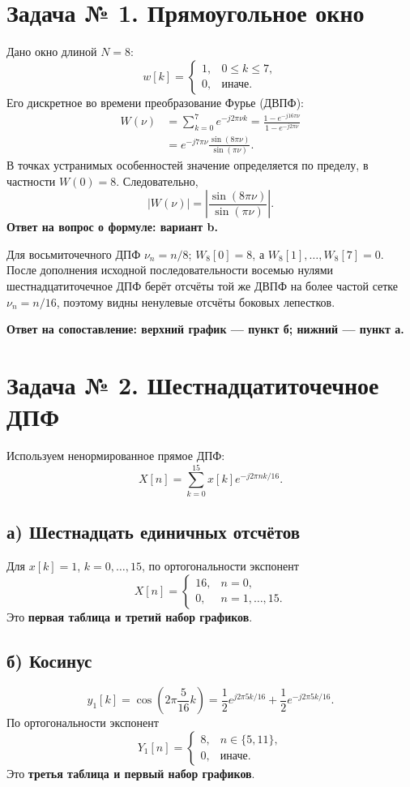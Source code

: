 \documentclass[12pt,a4paper]{article}
\begin{document}
\section*{Задача № 1. Прямоугольное окно}
Дано окно длиной $N=8$:
\[
 w[k]=\begin{cases}1,&0\le k\le7,\\0,&\text{иначе}.\end{cases}
\]
Его дискретное во времени преобразование Фурье (ДВПФ):
\begin{align*}
W(\nu)&=\sum_{k=0}^{7}e^{-j2\pi\nu k}
=\frac{1-e^{-j16\pi\nu}}{1-e^{-j2\pi\nu}}\\
&=e^{-j7\pi\nu}\frac{\sin(8\pi\nu)}{\sin(\pi\nu)}.
\end{align*}
В точках устранимых особенностей значение определяется по пределу, в частности $W(0)=8$. Следовательно,
\[
|W(\nu)|=\left|\frac{\sin(8\pi\nu)}{\sin(\pi\nu)}\right|.
\]
\textbf{Ответ на вопрос о формуле: вариант b.}

Для восьмиточечного ДПФ $\nu_n=n/8$; $W_8[0]=8$, а $W_8[1],\ldots,W_8[7]=0$. После дополнения исходной последовательности восемью нулями шестнадцатиточечное ДПФ берёт отсчёты той же ДВПФ на более частой сетке $\nu_n=n/16$, поэтому видны ненулевые отсчёты боковых лепестков.

\textbf{Ответ на сопоставление: верхний график --- пункт б; нижний --- пункт а.}

\section*{Задача № 2. Шестнадцатиточечное ДПФ}
Используем ненормированное прямое ДПФ:
\[
X[n]=\sum_{k=0}^{15}x[k]e^{-j2\pi nk/16}.
\]
\subsection*{а) Шестнадцать единичных отсчётов}
Для $x[k]=1$, $k=0,\ldots,15$, по ортогональности экспонент
\[
X[n]=\begin{cases}16,&n=0,\\0,&n=1,\ldots,15.\end{cases}
\]
Это \textbf{первая таблица и третий набор графиков}.
\subsection*{б) Косинус}
\[
y_1[k]=\cos\left(2\pi\frac5{16}k\right)
=\frac12 e^{j2\pi5k/16}+\frac12e^{-j2\pi5k/16}.
\]
По ортогональности экспонент
\[
Y_1[n]=\begin{cases}8,&n\in\{5,11\},\\0,&\text{иначе}.\end{cases}
\]
Это \textbf{третья таблица и первый набор графиков}.
\end{document}
